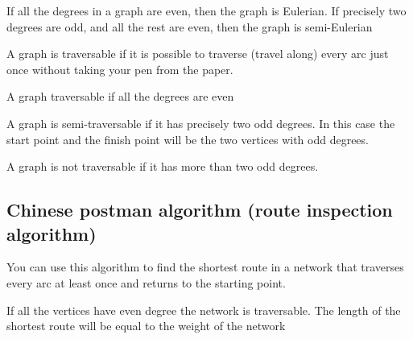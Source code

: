 \documentclass[a4paper]{article}
\begin{document}
\begin{defi}[Eulerian]
If all the degrees in a graph are even, then the graph is Eulerian. If precisely two degrees are odd, and all the rest are even, then the graph is semi-Eulerian
\end{defi}

\begin{defi}[Traversable]
A graph is traversable if it is possible to traverse (travel along) every arc just once without taking your pen from the paper.

\end{defi}

\begin{prop}
A graph traversable if all the degrees are even
\end{prop}

\begin{prop}
A graph is semi-traversable if it has precisely two odd degrees. In this case the start point and the finish point will be the two vertices with odd degrees.
\end{prop}

\begin{prop}
A graph is not traversable if it has more than two odd degrees.
\end{prop}

\begin{eg}

\end{eg}

\begin{eg}

\end{eg}

\begin{eg}

\end{eg}

\subsection{Chinese postman algorithm (route inspection algorithm)}
You can use this algorithm to find the shortest route in a network that traverses every arc at least once and returns to the starting point.
\begin{prop}
If all the vertices have even degree the network is traversable. The length of the shortest route will be equal to the weight of the network 
\end{prop}
\begin{eg}

\end{eg}
\begin{prop}

\end{prop}
\begin{eg}

\end{eg}
\begin{eg}

\end{eg}
\end{document}
